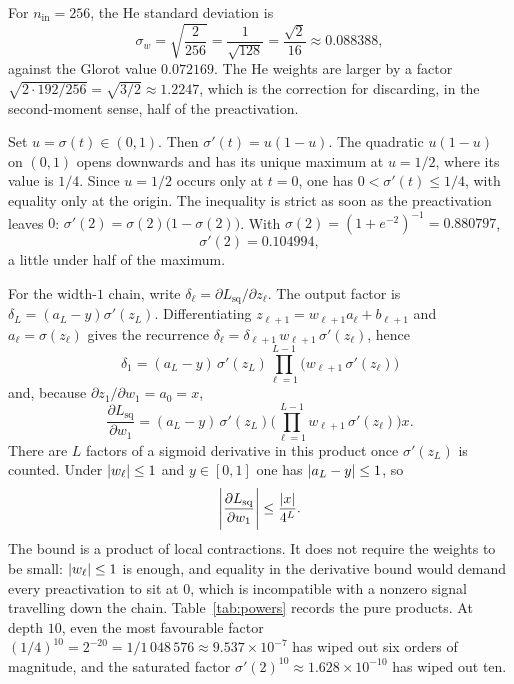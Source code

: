 For \(n_{\mathrm{in}}=256\), the He standard deviation is
\[
  \sigma_w = \sqrt{\frac{2}{256}} = \frac{1}{\sqrt{128}} = \frac{\sqrt{2}}{16} \approx 0.088388,
\]
against the Glorot value \(0.072169\). The He weights are larger by a factor \(\sqrt{2\cdot 192/256} = \sqrt{3/2}\approx 1.2247\), which is the correction for discarding, in the second-moment sense, half of the preactivation.


Set \(u=\sigma(t)\in(0,1)\). Then \(\sigma'(t)=u(1-u)\). The quadratic \(u(1-u)\) on \((0,1)\) opens downwards and has its unique maximum at \(u=1/2\), where its value is \(1/4\). Since \(u=1/2\) occurs only at \(t=0\), one has \(0<\sigma'(t)\le 1/4\), with equality only at the origin. The inequality is strict as soon as the preactivation leaves \(0\): \(\sigma'(2)=\sigma(2)\bigl(1-\sigma(2)\bigr)\). With \(\sigma(2)=(1+e^{-2})^{-1}=0.880797\),
\[
  \sigma'(2) = 0.104994,
\]
a little under half of the maximum.

For the width-\(1\) chain, write \(\delta_\ell = \partial L_{\mathrm{sq}}/\partial z_\ell\). The output factor is \(\delta_L = (a_L-y)\sigma'(z_L)\). Differentiating \(z_{\ell+1} = w_{\ell+1}a_\ell + b_{\ell+1}\) and \(a_\ell=\sigma(z_\ell)\) gives the recurrence \(\delta_\ell = \delta_{\ell+1}\, w_{\ell+1}\, \sigma'(z_\ell)\), hence
\begin{equation}
  \delta_1
  =
  (a_L-y)\,\sigma'(z_L)\prod_{\ell=1}^{L-1}\bigl(w_{\ell+1}\,\sigma'(z_\ell)\bigr)
  \label{eq:delta-prod}
\end{equation}
and, because \(\partial z_1/\partial w_1 = a_0 = x\),
\[
  \frac{\partial L_{\mathrm{sq}}}{\partial w_1}
  =
  (a_L-y)\,\sigma'(z_L)
  \Biggl(\prod_{\ell=1}^{L-1} w_{\ell+1}\,\sigma'(z_\ell)\Biggr) x.
\]
There are \(L\) factors of a sigmoid derivative in this product once \(\sigma'(z_L)\) is counted. Under \(\lvert w_\ell\rvert\le 1\) and \(y\in[0,1]\) one has \(\lvert a_L-y\rvert\le 1\), so
\begin{equation}
  \Biggl\lvert\frac{\partial L_{\mathrm{sq}}}{\partial w_1}\Biggr\rvert
  \le
  \frac{\lvert x\rvert}{4^L}.
  \label{eq:vanish-bound}
\end{equation}
The bound is a product of local contractions. It does not require the weights to be small: \(\lvert w_\ell\rvert\le 1\) is enough, and equality in the derivative bound would demand every preactivation to sit at \(0\), which is incompatible with a nonzero signal travelling down the chain. Table~\ref{tab:powers} records the pure products. At depth \(10\), even the most favourable factor \((1/4)^{10} = 2^{-20} = 1/1\,048\,576 \approx 9.537\times 10^{-7}\) has wiped out six orders of magnitude, and the saturated factor \(\sigma'(2)^{10}\approx 1.628\times 10^{-10}\) has wiped out ten.

